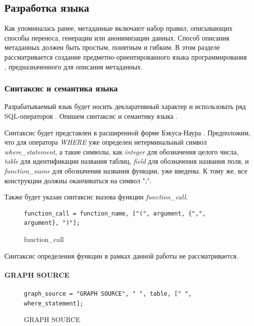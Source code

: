 \subsection{Разработка языка}
Как упоминалась ранее, метаданные включают набор правил, описывающих способы переноса, генерации или анонимизации данных. Способ описания метаданных должен быть простым, понятным и гибким. В этом разделе рассматривается создание предметно-ориентированного языка программирования \cite{dsl-how-create}, предназначенного для описания метаданных.

\subsubsection{Синтаксис и семантика языка}

Разрабатываемый язык будет носить декларативный характер и использовать ряд SQL-операторов \cite{sql}. Опишем синтаксис и семантику языка \cite{syntax-and-semantics}.

Синтаксис будет представлен в расширенной форме Бэкуса-Наура \cite{ebnf}. Предположим, что для оператора \textit{WHERE} уже определен нетерминальный символ \textit{where\_statement}, а такие символы, как \textit{integer} для обозначения целого числа, \textit{table} для идентификации названия таблиц, \textit{field} для обозначения названия поля, и \textit{function\_name} для обозначения названия функции, уже введены. К тому же, все конструкции должны оканчиваться на символ ";".

Также будет указан синтаксис вызова функции \textit{function\_call}.

\begin{figure}
  \begin{lstlisting}
function_call = function_name, ["(", argument, {",", argument}, ")"];
  \end{lstlisting}
  \caption{function\_call}
  \label{symbol-function-call}
\end{figure}

Синтаксис определения функции в рамках данной работы не рассматривается.

\paragraph{GRAPH SOURCE}

\begin{figure}
  \begin{lstlisting}
graph_source = "GRAPH SOURCE", " ", table, [" ", where_statement];
  \end{lstlisting}
  \caption{GRAPH SOURCE}
  \label{symbol-graph-source}
\end{figure}

